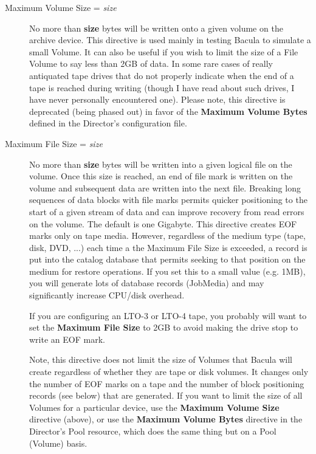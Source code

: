 \begin{description}
\item [Maximum Volume Size = {\it size}]
   No more than {\bf size} bytes will be written onto a given volume on the
   archive device.  This directive is used mainly in testing Bacula to
   simulate a small Volume.  It can also be useful if you wish to limit the
   size of a File Volume to say less than 2GB of data.  In some rare cases
   of really antiquated tape drives that do not properly indicate when the
   end of a tape is reached during writing (though I have read about such
   drives, I have never personally encountered one).  Please note, this
   directive is deprecated (being phased out) in favor of the {\bf Maximum
   Volume Bytes} defined in the Director's configuration file.

\item [Maximum File Size = {\it size}]
   No more than {\bf size} bytes will be written into a given logical file
   on the volume.  Once this size is reached, an end of file mark is
   written on the volume and subsequent data are written into the next
   file.  Breaking long sequences of data blocks with file marks permits
   quicker positioning to the start of a given stream of data and can
   improve recovery from read errors on the volume.  The default is one
   Gigabyte.  This directive creates EOF marks only on tape media.
   However, regardless of the medium type (tape, disk, DVD, ...) each time
   a the Maximum File Size is exceeded, a record is put into the catalog
   database that permits seeking to that position on the medium for
   restore operations. If you set this to a small value (e.g. 1MB),
   you will generate lots of database records (JobMedia) and may
   significantly increase CPU/disk overhead.

   If you are configuring an LTO-3 or LTO-4 tape, you probably will
   want to set the {\bf Maximum File Size} to 2GB to avoid making
   the drive stop to write an EOF mark.

   Note, this directive does not limit the size of Volumes that Bacula
   will create regardless of whether they are tape or disk volumes. It
   changes only the number of EOF marks on a tape and the number of
   block positioning records (see below) that are generated. If you
   want to limit the size of all Volumes for a particular device, use
   the {\bf Maximum Volume Size} directive (above), or use the
   {\bf Maximum Volume Bytes} directive in the Director's Pool resource,
   which does the same thing but on a Pool (Volume) basis.


\end{description}
